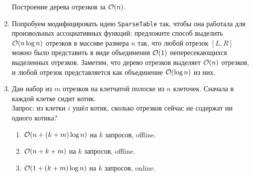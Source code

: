 \begin{enumerate}
\begin{solution}
		Построение дерева отрезков за $\mathcal{O}(n)$.
	\end{solution}

  \item
	Попробуем модифицировать идею \texttt{SparseTable} так, чтобы она работала для произвольных ассоциативных функций:
	предложите способ выделить $\mathcal{O}(n \log n)$ отрезков в массиве размера $n$ так, что любой
	отрезок $[L, R]$ можно было представить в виде объединения $\mathcal{O}(1)$ непересекающихся выделенных отрезков. 
	Заметим, что дерево отрезков выделяет $\mathcal{O}(n)$ отрезков, и любой отрезок
	представляется как объединение $\mathcal{O}(\log n)$ из них.

  \item
	Дан набор из $m$ отрезков на клетчатой полоске из $n$ клеточек. Сначала в каждой клетке сидит котик.\\
	Запрос: из клетки $i$ ушёл котик, сколько отрезков сейчас не содержат ни одного котика?

    \begin{enumerate}
      \item $\mathcal{O}(n + (k + m)\log{n})$ на $k$ запросов, offline.
      \item $\mathcal{O}(n + k + m)$ на $k$ запросов, offline.
      \item {} $\mathcal{O}(1 + (k + m)\log{n})$ на $k$ запросов, online.
    \end{enumerate}



\end{enumerate}
